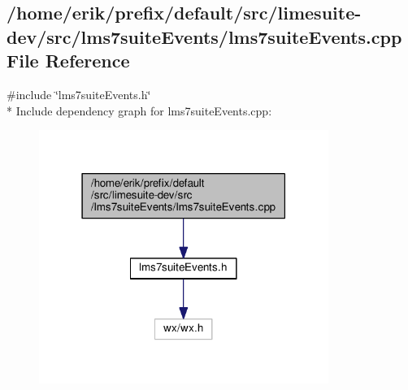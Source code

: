 \subsection{/home/erik/prefix/default/src/limesuite-\/dev/src/lms7suite\+Events/lms7suite\+Events.cpp File Reference}
\label{lms7suiteEvents_8cpp}
{\ttfamily \#include \char`\"{}lms7suite\+Events.\+h\char`\"{}}\\*
Include dependency graph for lms7suite\+Events.\+cpp\+:
\nopagebreak
\begin{figure}[H]
\begin{center}
\leavevmode
\includegraphics[width=267pt]{d1/d14/lms7suiteEvents_8cpp__incl}
\end{center}
\end{figure}

